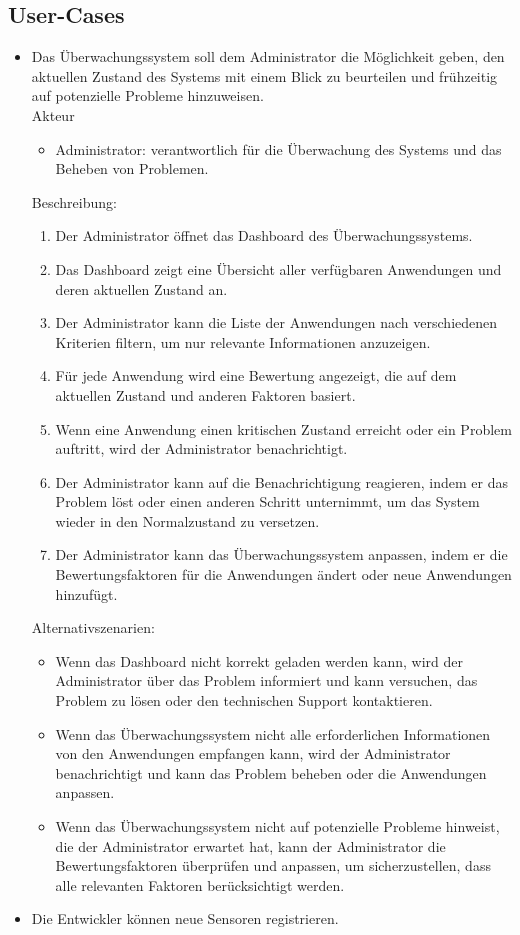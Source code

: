 \begin{flushleft}
\subsection{User-Cases}
\begin{itemize}
	\item Das Überwachungssystem soll dem Administrator die Möglichkeit geben, den aktuellen Zustand des Systems mit einem Blick zu beurteilen und frühzeitig auf potenzielle Probleme hinzuweisen.\\
Akteur
\begin{itemize}
	\item Administrator: verantwortlich für die Überwachung des Systems und das Beheben von Problemen.
\end{itemize}
Beschreibung:
\begin{enumerate}
	\item Der Administrator öffnet das Dashboard des Überwachungssystems.
	\item Das Dashboard zeigt eine Übersicht aller verfügbaren Anwendungen und deren aktuellen Zustand an.
	\item Der Administrator kann die Liste der Anwendungen nach verschiedenen Kriterien filtern, um nur relevante Informationen anzuzeigen.
	\item Für jede Anwendung wird eine Bewertung angezeigt, die auf dem aktuellen Zustand und anderen Faktoren basiert.
	\item Wenn eine Anwendung einen kritischen Zustand erreicht oder ein Problem auftritt, wird der Administrator benachrichtigt.
	\item Der Administrator kann auf die Benachrichtigung reagieren, indem er das Problem löst oder einen anderen Schritt unternimmt, um das System wieder in den Normalzustand zu versetzen.
	\item Der Administrator kann das Überwachungssystem anpassen, indem er die Bewertungsfaktoren für die Anwendungen ändert oder neue Anwendungen hinzufügt.
\end{enumerate}
Alternativszenarien:
\begin{itemize}
	\item Wenn das Dashboard nicht korrekt geladen werden kann, wird der Administrator über das Problem informiert und kann versuchen, das Problem zu lösen oder den technischen Support kontaktieren.
	\item Wenn das Überwachungssystem nicht alle erforderlichen Informationen von den Anwendungen empfangen kann, wird der Administrator benachrichtigt und kann das Problem beheben oder die Anwendungen anpassen.
	\item Wenn das Überwachungssystem nicht auf potenzielle Probleme hinweist, die der Administrator erwartet hat, kann der Administrator die Bewertungsfaktoren überprüfen und anpassen, um sicherzustellen, dass alle relevanten Faktoren berücksichtigt werden.
\end{itemize}
\item Die Entwickler können neue Sensoren registrieren.
\end{itemize}



\end{flushleft}

